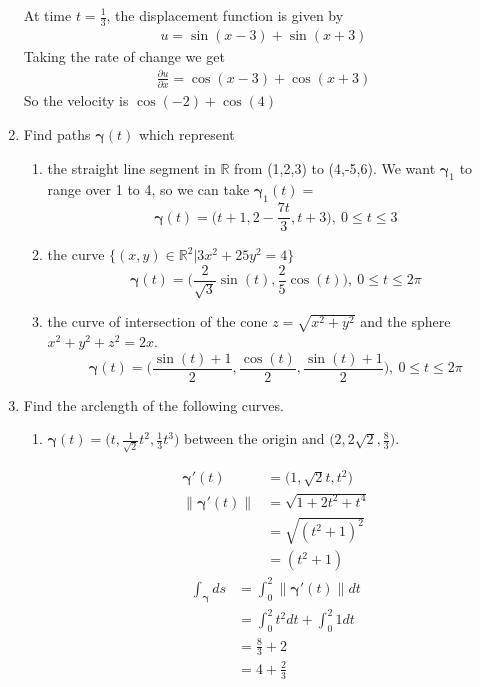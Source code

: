 \documentclass{article}
\newcommand{\norm}[1]{\| #1 \|}
\begin{document}
\begin{enumerate}
At time $t=\frac{1}{3}$, the displacement function is given by
\begin{align*} 
    u = \sin(x-3) + \sin(x+3)
\end{align*}
Taking the rate of change we get
\begin{align*} 
    \frac{\partial u}{\partial x} = \cos(x-3) + \cos(x+3)
\end{align*}
So the velocity is $\cos(-2) + \cos(4)$
\newpage
\item Find paths $\boldsymbol{\gamma}(t)$ which represent
\begin{enumerate}
    \item the straight line segment in $\mathbb{R}$ from (1,2,3) to (4,-5,6).
        We want $\boldsymbol{\gamma}_1$ to range over 1 to 4, so we can take $\boldsymbol{\gamma}_1(t)=$
        \[ \boldsymbol{\gamma}(t) = \Big(t+1,2-\frac{7t}{3}, t+3 \Big),\: 0 \leq t \leq 3 \]
    \item the curve $\{(x,y)\in \mathbb{R}^2|3x^2+25y^2=4\}$
        \[ \boldsymbol{\gamma}(t) = \Big(\frac{2}{\sqrt{3}} \sin(t), \frac{2}{5}\cos(t)\Big), \: 0 \leq t \leq 2\pi \]
    \item the curve of intersection of the cone $z=\sqrt{x^2 + y^2}$ and the sphere $x^2+y^2+z^2 = 2x$.
        \[ \boldsymbol{\gamma}(t) = \Big( \frac{\sin(t) + 1}{2}, \frac{\cos(t)}{2}, \frac{\sin(t) + 1}{2} \Big), \: 0 \leq t \leq 2\pi \]
\end{enumerate}

\newpage
\item Find the arclength of the following curves.
\begin{enumerate}
    \item $\displaystyle \boldsymbol{\gamma}(t) = \Bigg(t,\frac{1}{\sqrt{2}}t^2,\frac{1}{3}t^3 \Bigg)$ between the origin and $\displaystyle \Bigg(2,2\sqrt{2},\frac{8}{3}\Bigg)$.
    \begin{multicols}{2} 
    \noindent
    \begin{align*} 
        \boldsymbol{\gamma}'(t) &= \Big(1, \sqrt{2}t, t^2 \Big) \\
        \norm{\boldsymbol{\gamma}'(t)} &= \sqrt{1 + 2t^2 + t^4 } \\
        &= \sqrt{(t^2 + 1)^2 } \\ 
        &= (t^2 + 1) \
    \end{align*}
    \begin{align*}
        \int_{\boldsymbol{\gamma}} ds &= \int_0^2 \norm{\boldsymbol{\gamma}'(t)} dt \\
        &= \int_0^2 t^2 dt + \int_0^2 1 dt \\
        &= \frac{8}{3} + 2 \\
        &= 4 + \frac{2}{3}
    \end{align*}


\end{multicols}
\end{enumerate}
\end{enumerate}
\end{document}

